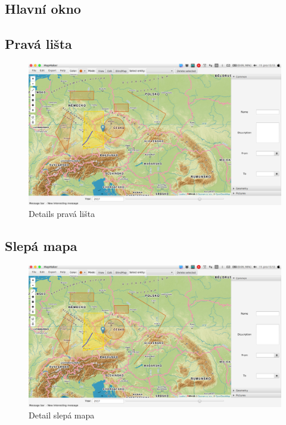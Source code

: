 \documentclass[12pt,a4paper,titlepage]{article}
\begin{document}
\subsection{Hlavní okno}

\subsection{Pravá lišta}

\begin{figure}[!htbp]
	\centering
	\includegraphics[scale=0.25]{full_window}
	\caption{Details pravá lišta}
	\label{rightBar}
\end{figure}

\subsection{Slepá mapa}

\begin{figure}[!htbp]
	\centering
	\includegraphics[scale=0.25]{full_window}
	\caption{Detail slepá mapa}
	\label{blindMap}
\end{figure}
\end{document}
